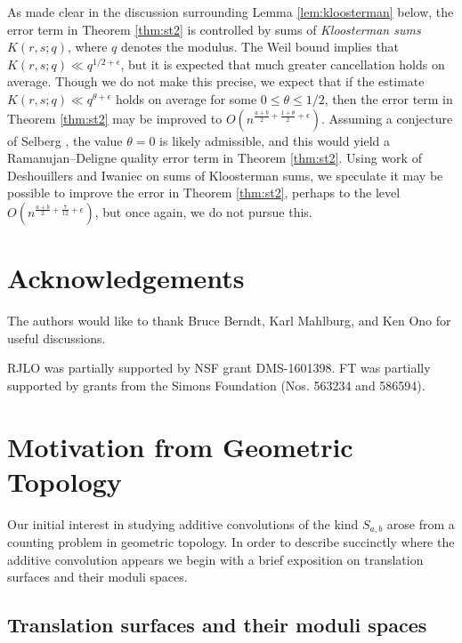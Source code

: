 \documentclass[12pt]{amsart}
\numberwithin{equation}{section}
\numberwithin{theorem}{section}
\begin{document}
As made clear in the discussion surrounding Lemma \ref{lem:kloosterman} below, the error term in Theorem \ref{thm:st2} is controlled by sums of \emph{Kloosterman sums} $K(r,s;q)$, where $q$ denotes the modulus.  The Weil bound implies that $K(r,s;q) \ll q^{1/2+\epsilon}$, but it is expected that much greater cancellation holds on average.  Though we do not make this precise, we expect that if the estimate $K(r,s;q) \ll q^{\theta+\epsilon}$ holds on average for some $0 \leq \theta \leq 1/2$, then the error term in Theorem \ref{thm:st2} may be improved to $O(n^{\frac{a+b}{2}+\frac{1+\theta}{2}+\epsilon})$.  Assuming a conjecture of Selberg \cite{Selberg}, the value $\theta=0$ is likely admissible, and this would yield a Ramanujan--Deligne quality error term in Theorem \ref{thm:st2}.  Using work of Deshouillers and Iwaniec \cite{DeshouillersIwaniec} on sums of Kloosterman sums, we speculate it may be possible to improve the error in Theorem \ref{thm:st2}, perhaps to the level $O(n^{\frac{a+b}{2}+\frac{7}{12}+\epsilon})$, but once again, we do not pursue this.


\section*{Acknowledgements}

The authors would like to thank Bruce Berndt, Karl Mahlburg, and Ken Ono for useful discussions.

RJLO was partially supported by NSF grant DMS-1601398. FT was partially supported by grants from the Simons Foundation (Nos. 563234 and 586594).


\section{Motivation from Geometric Topology}\label{sec:ggt}

Our initial interest in studying additive convolutions of the kind $S_{a,b}$ arose from a counting problem in geometric topology. 
In order to describe succinctly where the additive convolution appears we begin with a brief exposition on translation surfaces and their moduli spaces.

\subsection{Translation surfaces and their moduli spaces}
\end{document}
